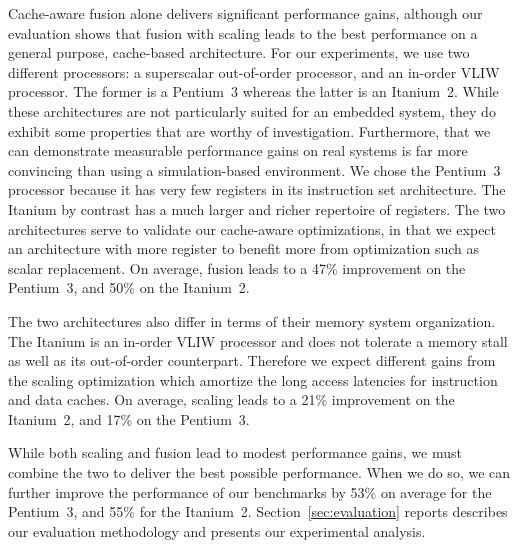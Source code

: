 Cache-aware fusion alone delivers significant performance gains, although our
evaluation shows that fusion with scaling leads to the best
performance on a general purpose, cache-based architecture. For our
experiments, we use two different processors: a superscalar out-of-order
processor, and an in-order VLIW processor. The former is a Pentium~3
whereas the latter is an Itanium~2. While these architectures are not
particularly suited for an embedded system, they do exhibit some
properties that are worthy of investigation. Furthermore, that we can
demonstrate measurable performance gains on real systems is far more
convincing than using a simulation-based environment. We chose the
Pentium~3 processor because it has very few registers in its
instruction set architecture. The Itanium by contrast has a much 
larger and richer repertoire of registers. The two architectures serve
to validate our cache-aware optimizations, in that we expect an
architecture with more register to benefit more from optimization such
as scalar replacement. On average, fusion leads to a 47\% improvement
on the Pentium~3, and 50\% on the Itanium~2.

The two architectures also differ in terms of their memory system
organization. The Itanium is an in-order VLIW processor and does not
tolerate a memory stall as well as its out-of-order
counterpart. Therefore we expect different gains from the scaling
optimization which amortize the long access latencies for instruction
and data caches. On average, scaling leads to a 21\% improvement on
the Itanium~2, and 17\% on the Pentium~3.

While both scaling and fusion lead to modest performance gains, we
must combine the two to deliver the best possible performance. When we
do so, we can further improve the performance of our benchmarks by
53\% on average for the Pentium~3, and 55\% for the Itanium~2.
Section~\ref{sec:evaluation} reports describes our evaluation
methodology and presents our experimental analysis.

